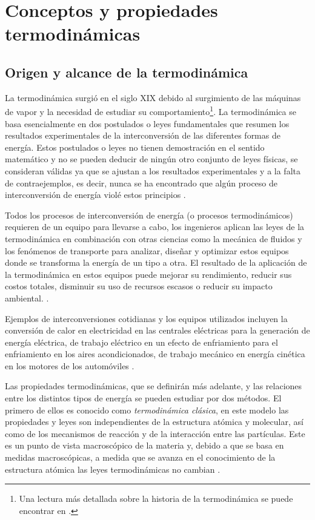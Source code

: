 \documentclass[../master.tex]{subfiles}
\begin{document}
\chapter{Conceptos y propiedades termodinámicas}

\section{Origen y alcance de la termodinámica}

La termodinámica surgió en el siglo XIX debido al surgimiento de las máquinas de vapor y la necesidad de estudiar su comportamiento\footnote{Una lectura más detallada sobre la historia de la termodinámica se puede encontrar en \cite{clavell}.}. La termodinámica se basa esencialmente en dos postulados o leyes fundamentales que resumen los resultados experimentales de la interconversión de las diferentes formas de energía. Estos postulados o leyes no tienen demostración en el sentido matemático y no se pueden deducir de ningún otro conjunto de leyes físicas, se consideran válidas ya que se ajustan a los resultados experimentales y a la falta de contraejemplos, es decir, nunca se ha encontrado que algún proceso de interconversión de energía violé estos principios \parencites{glasstone}{smith-vanness}.

Todos los procesos de interconversión de energía (o procesos termodinámicos) requieren de un equipo para llevarse a cabo, los ingenieros aplican las leyes de la termodinámica en combinación con otras ciencias como la mecánica de fluidos y los fenómenos de transporte para analizar, diseñar y optimizar estos equipos donde se transforma la energía de un tipo a otra. El resultado de la aplicación de la termodinámica en estos equipos puede mejorar su rendimiento, reducir sus costos totales, disminuir su uso de recursos escasos o reducir su impacto ambiental. \parencites{wark}{moranshapiro}.

Ejemplos de interconversiones cotidianas y los equipos utilizados incluyen la conversión de calor en electricidad en las centrales eléctricas para la generación de energía eléctrica, de trabajo eléctrico en un efecto de enfriamiento para el enfriamiento en los aires acondicionados, de trabajo mecánico en energía cinética en los motores de los automóviles \parencite{faires}.

Las propiedades termodinámicas, que se definirán más adelante, y las relaciones entre los distintos tipos de energía se pueden estudiar por dos métodos. El primero de ellos es conocido como \emph{termodinámica clásica}, en este modelo las propiedades y leyes son independientes de la estructura atómica y molecular, así como de los mecanismos de reacción y de la interacción entre las partículas. Este es un punto de vista macroscópico de la materia y, debido a que se basa en medidas macroscópicas, a medida que se avanza en el conocimiento de la estructura atómica las leyes termodinámicas no cambian \parencites{faires}{glasstone}{wark}.
\end{document}
